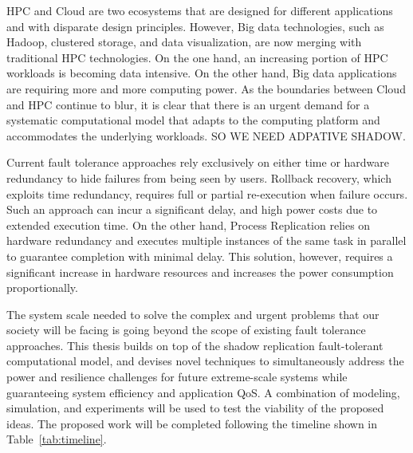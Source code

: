 HPC and Cloud are two ecosystems that are designed for different applications and with disparate design principles. However, Big data technologies, such as Hadoop, clustered storage, and data visualization, are now merging with traditional HPC technologies. 
On the one hand, an increasing portion of HPC workloads is becoming data intensive.
On the other hand, Big data applications are requiring more and more computing power. 
As the boundaries between Cloud and HPC continue to blur, it is clear that there is an urgent demand for a systematic computational model that adapts to the computing platform and accommodates the underlying
workloads. SO WE NEED ADPATIVE SHADOW.



Current fault tolerance approaches rely exclusively on either time or hardware redundancy to hide failures from being seen by users. 
Rollback recovery, which exploits time redundancy, requires full or partial re-execution when failure occurs.  
Such an approach
can incur a significant delay, %
and high power costs due to extended execution time.
On the other hand, Process Replication relies on hardware redundancy and executes multiple
instances of the same task in parallel to guarantee completion with minimal delay. 
This solution, however, requires a significant increase in hardware resources and increases the power consumption proportionally. 

The system scale needed to solve the complex and urgent problems that our society will be facing is going beyond the scope of existing 
fault tolerance approaches. This thesis builds on top of the shadow replication fault-tolerant computational model, and 
devises novel techniques to simultaneously address the power and resilience challenges for future extreme-scale systems while guaranteeing system efficiency and application QoS. 
A combination of modeling, simulation, and experiments will be used to test the viability of the proposed ideas. The proposed work will be completed following the timeline shown in 
Table~\ref{tab:timeline}.








